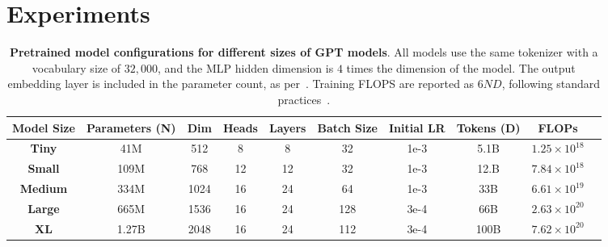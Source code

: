 \section{Experiments}
\label{sec:expe}

\begin{table*}[t!]
    \centering
    \begin{tabular}{cccccccccc}
    \textbf{Model Size} & \textbf{Parameters (N)} & \textbf{Dim} &
    \textbf{Heads} & \textbf{Layers} & \textbf{Batch Size} & \textbf{Initial LR} & \textbf{Tokens (D)} & \textbf{FLOPs}\\ %
    \toprule
    \textcolor{appleblue}{\textbf{Tiny}}                & 41M                      & 512                   & 8              & 8              & 32                  & 1e-3                 & 5.1B             & $1.25\times 10^{18}$\\ %
    \textcolor{appleorange}{\textbf{Small}}               & 109M                     & 768                   & 12             & 12             & 32                  & 1e-3                 & 12.B             & $7.84\times 10^{18}$\\ %
    \textcolor{applegreen}{\textbf{Medium}}              & 334M                     & 1024                   & 16             & 24             & 64                  & 1e-3                 & 33B             & $6.61\times 10^{19}$\\ %
    \textcolor{applered}{\textbf{Large}}               & 665M                     & 1536                   & 16             & 24             & 128                 & 3e-4                 & 66B             & $2.63\times 10^{20}$\\ %
    \textcolor{applepurple}{\textbf{XL}}                  & 1.27B                    & 2048                   & 16             & 24             & 112                 & 3e-4                 & 100B             & $7.62\times 10^{20}$\\
    \end{tabular}
    \caption{\textbf{Pretrained model configurations for different sizes of GPT models}. All models use the same tokenizer with a vocabulary size of $32,000$, and the MLP hidden dimension is $4$ times the dimension of the model. The output embedding layer is included in the parameter count, as per~\citet{porian2024resolving}. Training FLOPS are reported as $6ND$, following standard practices~\citep{kaplan2020scaling}. }
    \label{tab:model_configurations}
\end{table*}


